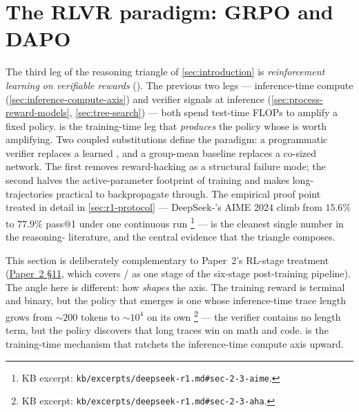 
\section{The RLVR paradigm: GRPO and DAPO}
\label{sec:rlvr-grpo-dapo}
\label{sec:rlvr}

The third leg of the reasoning triangle of \cref{sec:introduction} is
\emph{reinforcement learning on verifiable rewards} (). The previous
two legs --- inference-time compute (\cref{sec:inference-compute-axis})
and verifier signals at inference (\cref{sec:process-reward-models},
\cref{sec:tree-search}) --- both spend test-time FLOPs to amplify a
fixed policy.  is the training-time leg that \emph{produces} the
policy whose  is worth amplifying. Two coupled
substitutions define the paradigm: a programmatic verifier replaces a
learned , and a group-mean baseline replaces a co-sized
 network. The first removes reward-hacking as a structural failure
mode; the second halves the active-parameter footprint of training and
makes long- trajectories practical to backpropagate through. The
empirical proof point treated in detail in \cref{sec:r1-protocol} ---
DeepSeek-'s AIME 2024 climb from $15.6\%$ to $77.9\%$ pass@1
under one continuous  run \citep[\S
2.3]{deepseek-r1}\footnote{KB excerpt:
\nolinkurl{kb/excerpts/deepseek-r1.md#sec-2-3-aime}.} --- is the cleanest
single number in the reasoning- literature, and the central evidence
that the triangle composes.

This section is deliberately complementary to Paper~2's RL-stage
treatment (\hyperref[P2-sec:rlvr-grpo]{Paper~2 §11}, which covers / as one stage of the
six-stage post-training pipeline). The angle here is different: how
 \emph{shapes} the  axis. The training reward is
terminal and binary, but the policy that emerges is one whose
inference-time trace length grows from $\sim\!200$ tokens to
$\sim\!10^4$ on its own \citep[\S 2.3]{deepseek-r1}\footnote{KB excerpt:
\nolinkurl{kb/excerpts/deepseek-r1.md#sec-2-3-aha}.} --- the verifier
contains no length term, but the policy discovers that long traces win
on math and code.  is the training-time mechanism that ratchets
the inference-time compute axis upward.


